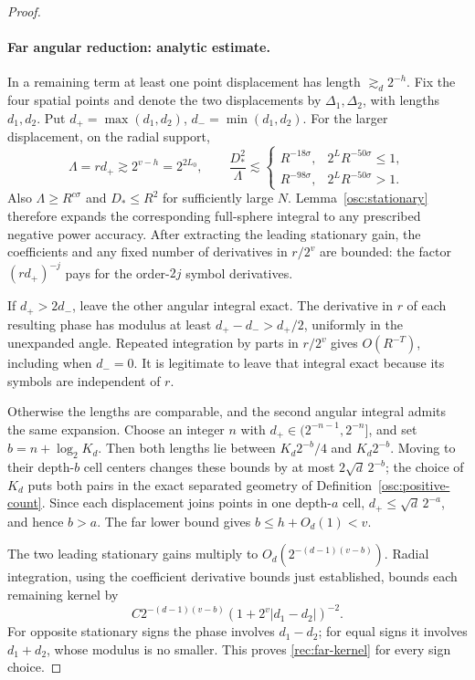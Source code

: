 \begin{proof}
\paragraph{Far angular reduction: analytic estimate.}
In a remaining term at least one point displacement has length
\(\gtrsim_d2^{-h}\).  Fix the four spatial points and denote the two
displacements by \(\Delta_1,\Delta_2\), with lengths \(d_1,d_2\).
Put \(d_+=\max(d_1,d_2)\), \(d_-=\min(d_1,d_2)\).
For the larger displacement, on the radial support,
\[
 \Lambda=r d_+\gtrsim 2^{v-h}=2^{2L_0},\qquad
 \frac{D_*^2}{\Lambda}
 \lesssim
 \begin{cases}
 R^{-18\sigma},&2^LR^{-50\sigma}\le1,\\
 R^{-98\sigma},&2^LR^{-50\sigma}>1.
 \end{cases}
\]
Also \(\Lambda\ge R^{c\sigma}\) and \(D_*\le R^2\) for
sufficiently large \(N\).  Lemma~\ref{osc:stationary} therefore
expands the corresponding full-sphere integral to any prescribed
negative power accuracy.  After extracting the leading stationary
gain, the coefficients and any fixed number of derivatives in
\(r/2^v\) are bounded: the factor \((r d_+)^{-j}\) pays for the
order-\(2j\) symbol derivatives.

If \(d_+>2d_-\), leave the other angular integral exact.  The
derivative in \(r\) of each resulting phase has modulus at least
\(d_+-d_->d_+/2\), uniformly in the unexpanded angle.  Repeated
integration by parts in \(r/2^v\) gives \(O(R^{-T})\), including
when \(d_-=0\).  It is legitimate to leave that integral exact
because its symbols are independent of \(r\).

Otherwise the lengths are comparable, and the second angular
integral admits the same expansion.  Choose an integer \(n\) with
\(d_+\in(2^{-n-1},2^{-n}]\), and set
\(b=n+\log_2K_d\).  Then both lengths lie between
\(K_d2^{-b}/4\) and \(K_d2^{-b}\).  Moving to their depth-\(b\)
cell centers changes these bounds by at most
\(2\sqrt d\,2^{-b}\); the choice of \(K_d\) puts both pairs in
the exact separated geometry of Definition~\ref{osc:positive-count}.
Since each displacement joins points in one depth-\(a\) cell,
\(d_+\le\sqrt d\,2^{-a}\), and hence \(b>a\).  The far lower
bound gives \(b\le h+O_d(1)<v\).

The two leading stationary gains multiply to
\(O_d(2^{-(d-1)(v-b)})\).  Radial integration, using the coefficient
derivative bounds just established, bounds each remaining kernel by
\begin{equation}\label{rec:far-kernel}
 C2^{-(d-1)(v-b)}
       (1+2^v|d_1-d_2|)^{-2}.
\end{equation}
For opposite stationary signs the phase involves \(d_1-d_2\);
for equal signs it involves \(d_1+d_2\), whose modulus is no
smaller.  This proves \eqref{rec:far-kernel} for every sign choice.


\end{proof}
